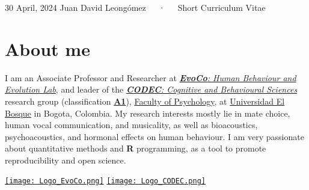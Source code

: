 \documentclass[11pt,a4paper,]{awesome-cv}
\begin{document}
\makecvheader

\makecvfooter
  {30 April, 2024}
    {Juan David Leongómez~~~·~~~Short Curriculum Vitae}
  {\thepage}





\hypertarget{about-me}{%
\section{About me}\label{about-me}}

\begin{minipage}[c]{0.9\linewidth}
I am an Associate Professor and Researcher at \href{https://jdleongomez.info/en/team/}{\textit{\textbf{EvoCo}: Human Behaviour and Evolution Lab}}, and leader of the \href{https://investigaciones.unbosque.edu.co/codec}{\textit{\textbf{CODEC}: Cognitive and Behavioural Sciences}} research group (classification \href{https://scienti.minciencias.gov.co/gruplac/jsp/visualiza/visualizagr.jsp?nro=00000000001446}{\textbf{A1}}), \href{https://www.uelbosque.edu.co/psicologia}{Faculty of Psychology}, at \href{https://www.uelbosque.edu.co/}{Universidad El Bosque} in Bogota, Colombia. My research interests mostly lie in mate choice, human vocal communication, and musicality, as well as bioacoustics, psychoacoustics, and hormonal effects on human behaviour. I am very passionate about quantitative methods and \textbf{R} programming, as a tool to promote reproducibility and open science.
\end{minipage} \begin{minipage}[c]{0.1\linewidth}
\begin{flushright} 
\hfill \href{https://jdleongomez.info/en/team/}{\texttt{[image: Logo\_EvoCo.png]}} \newline \href{https://investigaciones.unbosque.edu.co/codec}{\texttt{[image: Logo\_CODEC.png]}}
\end{flushright}
\end{minipage}
\end{document}
